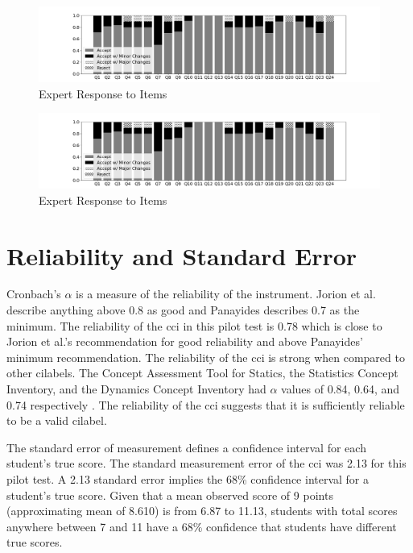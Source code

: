 \iflong
\begin{figure}[!htbp]
    \begin{center}
    \advance\leftskip-3cm
    \advance\rightskip-3cm
    \includegraphics[scale=.5]{images/bar.png}
    \caption{Expert Response to Items}
    \label{fig:accept_rej}
\end{center}
\end{figure}
\fi

\ifshort
\begin{figure}[!htbp]
    \begin{center}
    \advance\leftskip-3cm
    \advance\rightskip-3cm
    \includegraphics[scale=.3]{images/bar.png}
    \caption{Expert Response to Items}
    \label{fig:accept_rej}
\end{center}
\end{figure}
\fi

\FloatBarrier
\section{Reliability and Standard Error}

Cronbach's $\alpha$ is a measure of the reliability of the instrument. Jorion et al. \cite{jorian} describe anything above 0.8 as good and Panayides \cite{panayiotis} describes 0.7 as the minimum. The reliability of the \gls{cci} in this pilot test is 0.78 which is close to Jorion et al.'s recommendation for good reliability and above Panayides' minimum recommendation. The reliability of the \gls{cci} is strong when compared to other \glspl{cilabel}. The Concept Assessment Tool for Statics, the Statistics Concept Inventory, and the Dynamics Concept Inventory had $\alpha$ values of 0.84, 0.64, and 0.74 respectively \cite{jorian}. The reliability of the \gls{cci} suggests that it is sufficiently reliable to be a valid \gls{cilabel}.

The standard error of measurement defines a confidence interval for each student's true score. The standard measurement error of the \gls{cci} was 2.13 for this pilot test. A 2.13 standard error implies the 68\% confidence interval for a student’s true score. Given that a mean observed score of 9 points (approximating mean of 8.610) is from 6.87 to 11.13, students with total scores anywhere between 7 and 11 have a 68\% confidence that students have different true scores. 

